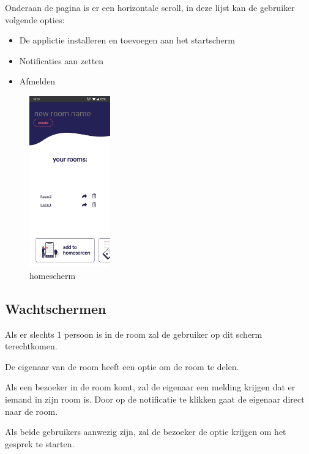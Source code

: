 		Onderaan de pagina is er een horizontale scroll, in deze lijst kan de gebruiker volgende opties:
		\begin{itemize}
			\item De applictie installeren en toevoegen aan het startscherm
			\item Notificaties aan zetten 
			\item Afmelden
		\end{itemize}
		
			\begin{figure}[H]
				\centering
				\includegraphics[width=35mm]{./img/POC/home}{}		
				\caption{homescherm}
			\end{figure}
		
		
		
	\subsection{Wachtschermen}
		Als er slechts 1 persoon is in de room zal de gebruiker op dit scherm terechtkomen. 
		
		De eigenaar van de room heeft een optie om de room te delen. 
		
		Als een bezoeker in de room komt, zal de eigenaar een melding krijgen dat er iemand in zijn room is. Door op de notificatie te klikken gaat de eigenaar direct naar de room.
						
		Als beide gebruikers aanwezig zijn, zal de bezoeker de optie krijgen om het gesprek te starten.
		
